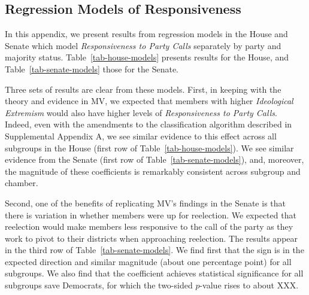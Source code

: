 \documentclass[12pt]{article}
\begin{document}
\clearpage

\subsection*{Regression Models of Responsiveness}
%

In this appendix, we present results from regression models in the House and Senate which model \textit{Responsiveness to Party Calls} separately by party and majority status.  Table~\ref{tab-house-models} presents results for the House, and Table~\ref{tab-senate-models} those for the Senate.

Three sets of results are clear from these models. First, in keeping with the theory and evidence in MV, we expected that members with higher \textit{Ideological Extremism} would also have higher levels of \textit{Responsiveness to Party Calls}.  Indeed, even with the amendments to the classification algorithm described in Supplemental Appendix A, we see similar evidence to this effect across all subgroups in the House (first row of Table~\ref{tab-house-models}).  We see similar evidence from the Senate (first row of Table~\ref{tab-senate-models}), and, moreover, the magnitude of these coefficients is remarkably consistent across subgroup and chamber.

Second, one of the benefits of replicating MV's findings in the Senate is that there is variation in whether members were up for reelection.  We expected that reelection would make members less responsive to the call of the party as they work to pivot to their districts when approaching reelection.  The results appear in the third row of Table~\ref{tab-senate-models}.  We find first that the sign is in the expected direction and similar magnitude (about one percentage point) for all subgroups.  We also find that the coefficient achieves statistical significance for all subgroups save Democrats, for which the two-sided $p$-value rises to about XXX.

\end{document}
